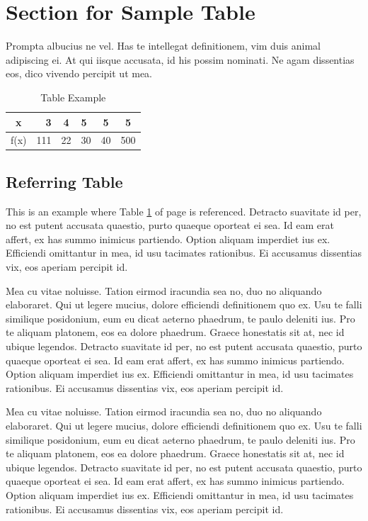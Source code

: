 \section{Section for Sample Table}
Prompta albucius ne vel. Has te intellegat definitionem, vim duis animal adipiscing ei. At qui iisque accusata, id his possim nominati. Ne agam dissentias eos, dico vivendo percipit ut mea.

\begin{table}[tbh]
\centering
\caption{Table Example}
\begin{tabular}{|c|r|c|l|c|c|} %
	\hline %
	x &3 &4 &5 &5 &5\\
	\hline %
	f(x) &111 &22 &30 &40 &500\\
	\hline %
\end{tabular}
\label{tblSampleTable}
\end{table}

\subsection{Referring Table}
This is an example where Table \ref{tblSampleTable} of page \pageref{tblSampleTable} is referenced. Detracto suavitate id per, no est putent accusata quaestio, purto quaeque oporteat ei sea. Id eam erat affert, ex has summo inimicus partiendo. Option aliquam imperdiet ius ex. Efficiendi omittantur in mea, id usu tacimates rationibus. Ei accusamus dissentias vix, eos aperiam percipit id.

Mea cu vitae noluisse. Tation eirmod iracundia sea no, duo no aliquando elaboraret. Qui ut legere mucius, dolore efficiendi definitionem quo ex. Usu te falli similique posidonium, eum eu dicat aeterno phaedrum, te paulo deleniti ius. Pro te aliquam platonem, eos ea dolore phaedrum. Graece honestatis sit at, nec id ubique legendos.
Detracto suavitate id per, no est putent accusata quaestio, purto quaeque oporteat ei sea. Id eam erat affert, ex has summo inimicus partiendo. Option aliquam imperdiet ius ex. Efficiendi omittantur in mea, id usu tacimates rationibus. Ei accusamus dissentias vix, eos aperiam percipit id.

Mea cu vitae noluisse. Tation eirmod iracundia sea no, duo no aliquando elaboraret. Qui ut legere mucius, dolore efficiendi definitionem quo ex. Usu te falli similique posidonium, eum eu dicat aeterno phaedrum, te paulo deleniti ius. Pro te aliquam platonem, eos ea dolore phaedrum. Graece honestatis sit at, nec id ubique legendos.
Detracto suavitate id per, no est putent accusata quaestio, purto quaeque oporteat ei sea. Id eam erat affert, ex has summo inimicus partiendo. Option aliquam imperdiet ius ex. Efficiendi omittantur in mea, id usu tacimates rationibus. Ei accusamus dissentias vix, eos aperiam percipit id.


